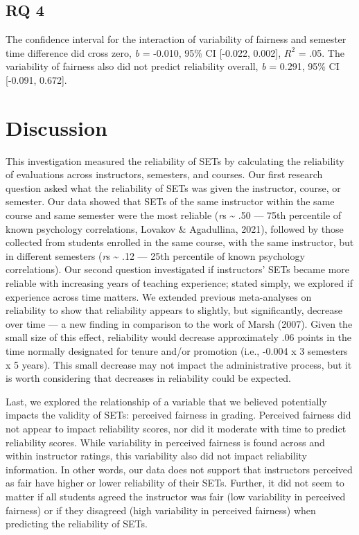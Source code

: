 \documentclass[
  man]{apa7}
\begin{document}
\hypertarget{rq-4-1}{%
\subsection{RQ 4}\label{rq-4-1}}

The confidence interval for the interaction of variability of fairness
and semester time difference did cross zero, \emph{b} =
-0.010, 95\% CI
{[}-0.022,
0.002{]}, \(R^2\) =
.05.
The variability of fairness also did not predict reliability overall,
\emph{b} = 0.291, 95\% CI
{[}-0.091,
0.672{]}.

\hypertarget{discussion}{%
\section{Discussion}\label{discussion}}

This investigation measured the reliability of SETs by calculating the
reliability of evaluations across instructors, semesters, and courses.
Our first research question asked what the reliability of SETs was given
the instructor, course, or semester. Our data showed that SETs of the
same instructor within the same course and same semester were the most
reliable (\emph{r}s \textasciitilde{} .50 --- 75th percentile of known psychology
correlations, Lovakov \& Agadullina, 2021), followed by those collected from students
enrolled in the same course, with the same instructor, but in different
semesters (\emph{r}s \textasciitilde{} .12 --- 25th percentile of known psychology
correlations). Our second question investigated if instructors' SETs
became more reliable with increasing years of teaching experience;
stated simply, we explored if experience across time matters. We
extended previous meta-analyses on reliability to show that reliability
appears to slightly, but significantly, decrease over time --- a new
finding in comparison to the work of Marsh (2007). Given the small size of
this effect, reliability would decrease approximately .06 points in the
time normally designated for tenure and/or promotion (i.e., -0.004 x 3
semesters x 5 years). This small decrease may not impact the
administrative process, but it is worth considering that decreases in
reliability could be expected.

Last, we explored the relationship of a variable that we believed
potentially impacts the validity of SETs: perceived fairness in grading.
Perceived fairness did not appear to impact reliability scores, nor did
it moderate with time to predict reliability scores. While variability
in perceived fairness is found across and within instructor ratings,
this variability also did not impact reliability information. In other
words, our data does not support that instructors perceived as fair have
higher or lower reliability of their SETs. Further, it did not seem to
matter if all students agreed the instructor was fair (low variability
in perceived fairness) or if they disagreed (high variability in
perceived fairness) when predicting the reliability of SETs.
\end{document}
